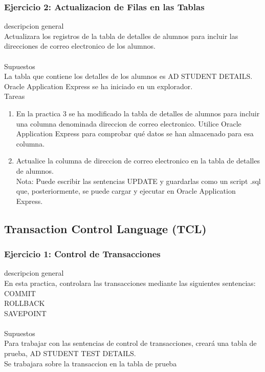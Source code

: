 \documentclass[12pt,letterpaper]{article}
\begin{document}
		\subsubsection{Ejercicio 2: Actualizacion de Filas en las Tablas} 
descripcion general  \\
Actualizara los registros de la tabla de detalles de alumnos para incluir las direcciones de correo electronico de los alumnos.\\
 \\
Supuestos\\
La tabla que contiene los detalles de los alumnos es AD STUDENT DETAILS.\\
Oracle Application Express se ha iniciado en un explorador.\\


Tareas\\
\begin{enumerate}[1.]
    \item En la practica 3 se ha modificado la tabla de detalles de alumnos para incluir una columna denominada direccion de correo electronico. Utilice Oracle Application Express para comprobar qué datos se han almacenado para esa columna.  
     \item Actualice la columna de direccion de correo electronico en la tabla de detalles de alumnos.\\
    Nota: Puede escribir las sentencias UPDATE y guardarlas como un script .sql que, posteriormente, se puede cargar y ejecutar en Oracle Application Express.\\
    
		\end{enumerate}





\newpage
\subsection{Transaction Control Language (TCL)} 


\subsubsection{Ejercicio 1: Control de Transacciones} 
descripcion general  \\
En esta practica, controlara las transacciones mediante las siguientes sentencias:
COMMIT\\
ROLLBACK\\
SAVEPOINT\\
 \\
Supuestos\\
Para trabajar con las sentencias de control de transacciones, creará una tabla de prueba, AD STUDENT TEST DETAILS.\\
Se trabajara sobre la transaccion en la tabla de prueba\\
\end{document}
